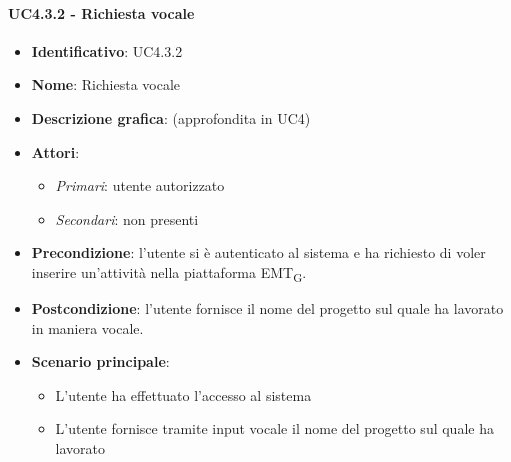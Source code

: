 \paragraph{UC4.3.2 - Richiesta vocale}
\begin{itemize}
   \item \textbf{Identificativo}: UC4.3.2
   \item \textbf{Nome}: Richiesta vocale
   \item \textbf{Descrizione grafica}: (approfondita in UC4)
   \item \textbf{Attori}:
   \begin{itemize} 
       \item \textit{Primari}: utente autorizzato
       \item \textit{Secondari}: non presenti
   \end{itemize}
       \item \textbf{Precondizione}: l'utente si è autenticato al sistema e ha richiesto di voler inserire un'attività nella piattaforma EMT\textsubscript{G}. 
       \item \textbf{Postcondizione}: l'utente fornisce il nome del progetto sul quale ha lavorato in maniera vocale.
    \item \textbf{Scenario principale}: 
       \begin{itemize}
           \item L'utente ha effettuato l'accesso al sistema 
           \item L'utente fornisce tramite input vocale il nome del progetto sul quale ha lavorato
       \end{itemize}
\end{itemize}

